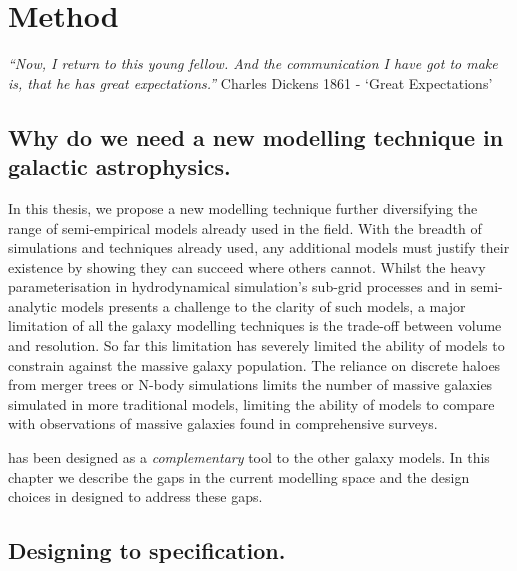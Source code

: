 
\chapter{Method} %
\label{Chapter:Method}
\begin{center}
    \textit{``Now, I return to this young fellow. And the communication I have got to make is, that he has great expectations.''}
    Charles Dickens 1861 - `Great Expectations'
\end{center}

\section{Why do we need a new modelling technique in galactic astrophysics.}
In this thesis, we propose a new modelling technique further diversifying the range of semi-empirical models already used in the field. With the breadth of simulations and techniques already used, any additional models must justify their existence by showing they can succeed where others cannot. Whilst the heavy parameterisation in hydrodynamical simulation's sub-grid processes and in semi-analytic models presents a challenge to the clarity of such models, a major limitation of all the galaxy modelling techniques is the trade-off between volume and resolution. So far this limitation has severely limited the ability of models to constrain against the massive galaxy population. The reliance on discrete haloes from merger trees or N-body simulations limits the number of massive galaxies simulated in more traditional models, limiting the ability of models to compare with observations of massive galaxies found in comprehensive surveys. 

\steel has been designed as a \textit{complementary} tool to the other galaxy models. In this chapter we describe the gaps in the current modelling space and the design choices in \steel designed to address these gaps.

\section{Designing to specification.}
